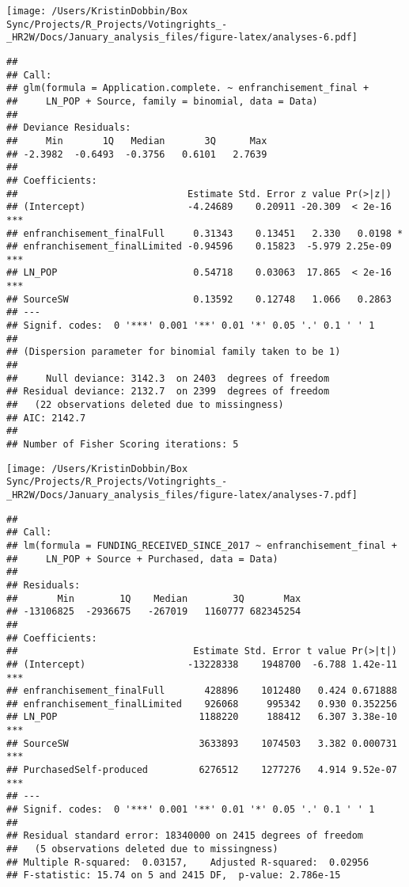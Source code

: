 \documentclass[
]{article}
\begin{document}
\texttt{[image: /Users/KristinDobbin/Box Sync/Projects/R\_Projects/Votingrights\_-\_HR2W/Docs/January\_analysis\_files/figure-latex/analyses-6.pdf]}

\begin{verbatim}
## 
## Call:
## glm(formula = Application.complete. ~ enfranchisement_final + 
##     LN_POP + Source, family = binomial, data = Data)
## 
## Deviance Residuals: 
##     Min       1Q   Median       3Q      Max  
## -2.3982  -0.6493  -0.3756   0.6101   2.7639  
## 
## Coefficients:
##                              Estimate Std. Error z value Pr(>|z|)    
## (Intercept)                  -4.24689    0.20911 -20.309  < 2e-16 ***
## enfranchisement_finalFull     0.31343    0.13451   2.330   0.0198 *  
## enfranchisement_finalLimited -0.94596    0.15823  -5.979 2.25e-09 ***
## LN_POP                        0.54718    0.03063  17.865  < 2e-16 ***
## SourceSW                      0.13592    0.12748   1.066   0.2863    
## ---
## Signif. codes:  0 '***' 0.001 '**' 0.01 '*' 0.05 '.' 0.1 ' ' 1
## 
## (Dispersion parameter for binomial family taken to be 1)
## 
##     Null deviance: 3142.3  on 2403  degrees of freedom
## Residual deviance: 2132.7  on 2399  degrees of freedom
##   (22 observations deleted due to missingness)
## AIC: 2142.7
## 
## Number of Fisher Scoring iterations: 5
\end{verbatim}

\texttt{[image: /Users/KristinDobbin/Box Sync/Projects/R\_Projects/Votingrights\_-\_HR2W/Docs/January\_analysis\_files/figure-latex/analyses-7.pdf]}

\begin{verbatim}
## 
## Call:
## lm(formula = FUNDING_RECEIVED_SINCE_2017 ~ enfranchisement_final + 
##     LN_POP + Source + Purchased, data = Data)
## 
## Residuals:
##       Min        1Q    Median        3Q       Max 
## -13106825  -2936675   -267019   1160777 682345254 
## 
## Coefficients:
##                               Estimate Std. Error t value Pr(>|t|)    
## (Intercept)                  -13228338    1948700  -6.788 1.42e-11 ***
## enfranchisement_finalFull       428896    1012480   0.424 0.671888    
## enfranchisement_finalLimited    926068     995342   0.930 0.352256    
## LN_POP                         1188220     188412   6.307 3.38e-10 ***
## SourceSW                       3633893    1074503   3.382 0.000731 ***
## PurchasedSelf-produced         6276512    1277276   4.914 9.52e-07 ***
## ---
## Signif. codes:  0 '***' 0.001 '**' 0.01 '*' 0.05 '.' 0.1 ' ' 1
## 
## Residual standard error: 18340000 on 2415 degrees of freedom
##   (5 observations deleted due to missingness)
## Multiple R-squared:  0.03157,    Adjusted R-squared:  0.02956 
## F-statistic: 15.74 on 5 and 2415 DF,  p-value: 2.786e-15
\end{verbatim}
\end{document}
